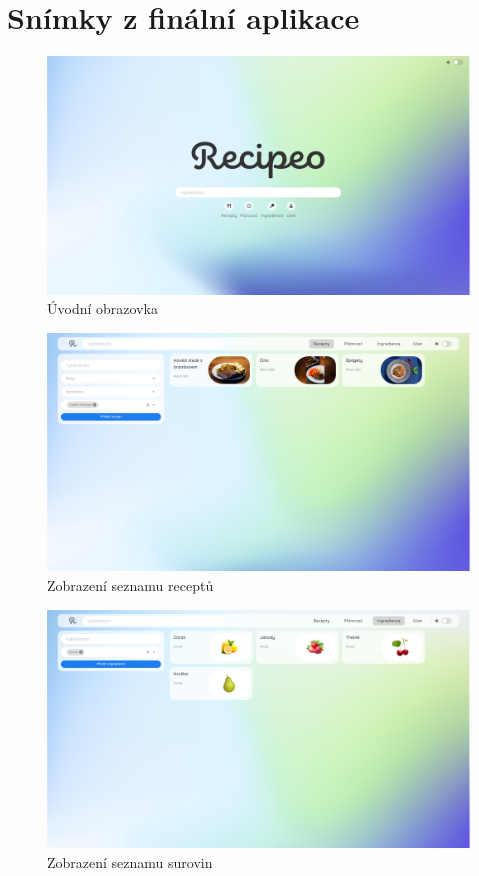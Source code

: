 \chapter{Snímky z finální aplikace}

\begin{figure}[H]
    \includegraphics[width=\textwidth]{images/final-look/uvodni-obrazovka}
    \caption{Úvodní obrazovka} \label{picture:recipeo:uvodni-obrazovka}
\end{figure}

\begin{figure}[H]
    \includegraphics[width=\textwidth]{images/final-look/recepty}
    \caption{Zobrazení seznamu receptů} \label{picture:recipeo:recepty}
\end{figure}

\begin{figure}[H]
    \includegraphics[width=\textwidth]{images/final-look/suroviny}
    \caption{Zobrazení seznamu surovin} \label{picture:recipeo:suroviny}
\end{figure}

